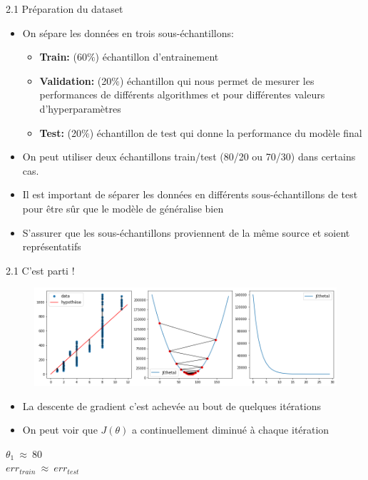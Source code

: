\begin{frame}{2.1 Préparation du dataset}
  \begin{itemize}
  \item On sépare les données en trois sous-échantillons:
    \begin{itemize}
      \normalsize
    \item \textbf{Train:} (60$\%$) échantillon d'entrainement
    \item \textbf{Validation:} (20$\%$) échantillon qui nous permet de mesurer les performances de différents algorithmes et pour différentes valeurs d'hyperparamètres
    \item \textbf{Test:} (20$\%$) échantillon de test qui donne la performance du modèle final
    \end{itemize}
  \item On peut utiliser deux échantillons train/test (80/20 ou 70/30) dans certains cas.
  \item Il est important de séparer les données en différents sous-échantillons de test pour être sûr que le modèle de généralise bien
  \item S'assurer que les sous-échantillons proviennent de la même source et soient représentatifs
  \end{itemize}
\end{frame}

\begin{frame}{2.1 C'est parti !}
  \begin{figure}
    \includegraphics[width=\textwidth]{figs/gradDescent.png}
  \end{figure}
  \begin{itemize}
  \item La descente de gradient c'est achevée au bout de quelques itérations
  \item On peut voir que $J(\theta)$ a continuellement diminué à chaque itération
  \end{itemize}
  \begin{center}
    $\theta_{1} ~ \approx ~ 80$ \\
    $err_{train} ~ \approx ~ err_{test}$
  \end{center}
\end{frame}

